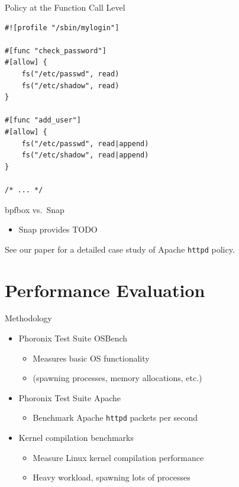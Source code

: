 \documentclass[12pt, dvipsnames]{beamer}
\begin{document}
\begin{frame}[c, fragile]{Policy at the Function Call Level}
\begin{lstlisting}[language=bpfbox, xleftmargin=.25\textwidth]
#![profile "/sbin/mylogin"]

#[func "check_password"]
#[allow] {
    fs("/etc/passwd", read)
    fs("/etc/shadow", read)
}

#[func "add_user"]
#[allow] {
    fs("/etc/passwd", read|append)
    fs("/etc/shadow", read|append)
}

/* ... */
\end{lstlisting}
\end{frame}

\begin{frame}[c]{bpfbox vs.~Snap}
\begin{itemize}
    \item Snap provides TODO
\end{itemize}
\vfill
See our paper for a detailed case study of Apache \texttt{httpd} policy.
\end{frame}

\section{Performance Evaluation}

\begin{frame}[c]{Methodology}
\begin{itemize}
    \item Phoronix Test Suite OSBench
    \begin{itemize}
        \item Measures basic OS functionality
        \item (spawning processes, memory allocations, etc.)
    \end{itemize}

    \vfill
    \item Phoronix Test Suite Apache
    \begin{itemize}
        \item Benchmark Apache \texttt{httpd} packets per second
    \end{itemize}

    \vfill
    \item Kernel compilation benchmarks
    \begin{itemize}
        \item Measure Linux kernel compilation performance
        \item Heavy workload, spawning lots of processes
    \end{itemize}
\end{itemize}
\end{frame}
\end{document}
